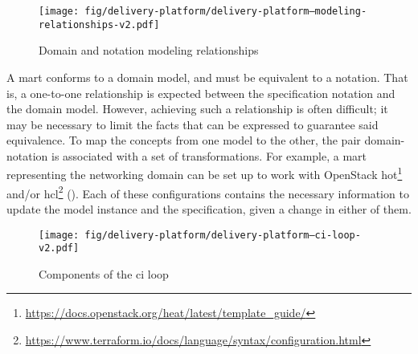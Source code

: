\begin{figure}[h]
	\centering
	\texttt{[image: fig/delivery-platform/delivery-platform--modeling-relationships-v2.pdf]}
	\caption{Domain and notation modeling relationships}
	\label{fig:delivery-platform--modeling-relationships}
\end{figure}

A \gls{mart} conforms to a domain model, and must be equivalent to a notation. That is, a one-to-one relationship is expected between the specification notation and the domain model. However, achieving such a relationship is often difficult; it may be necessary to limit the facts that can be expressed to guarantee said equivalence. To map the concepts from one model to the other, the pair domain-notation is associated with a set of transformations. For example, a \gls{mart} representing the networking domain can be set up to work with OpenStack \gls{hot}\footnote{\url{https://docs.openstack.org/heat/latest/template_guide/}} and/or \gls{hcl}\footnote{\url{https://www.terraform.io/docs/language/syntax/configuration.html}} (). Each of these configurations contains the necessary information to update the model instance and the specification, given a change in either of them.

\begin{figure}[h]
	\centering
	\texttt{[image: fig/delivery-platform/delivery-platform--ci-loop-v2.pdf]}
	\caption{Components of the \gls{ci} loop}
	\label{fig:delivery-platform--ci-loop}
\end{figure}

